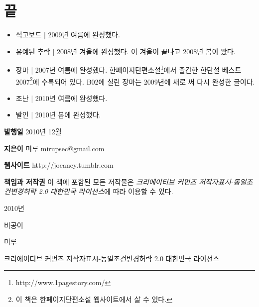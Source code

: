 \documentclass[a5paper,10pt, twoside, openright]{memoir}
\begin{document}
	\newpage{}
	\section*{}
	
\backmatter %

	\newpage{}
		\pagestyle{empty}	
	\tableofcontents*{}
	
	\chapter*{끝}
	\begin{itemize}
	\item{석고보드} | 2009년 여름에 완성했다.
	 
	 \item{유예된 추락} | 2008년 겨울에 완성했다. 이 겨울이 끝나고 2008년 봄이 왔다.
	
	\item{장마} | 2007년 여름에 완성했다. 한페이지단편소설\footnote{http://www.1pagestory.com/}에서 출간한 한단설 베스트 2007\footnote{이 책은 한페이지단편소설 웹사이트에서 살 수 있다.}에 수록되어 있다. B02에 실린 장마는 2009년에 새로 써 다시 완성한 글이다.

	\item{조난} | 2010년 여름에 완성했다.
	
	\item{발인} | 2010년 봄에 완성했다.
	\end{itemize}

	\newpage{}
	\calccentering{\unitlength}
	\begin{adjustwidth*}{7em}{1em}
	\begin{description}
	\item{\textbf{발행일}}
		2010년 12월
	\item{\textbf{지은이}} 
		미루 mirupsec@gmail.com
	\item{\textbf{웹사이트}}
		http://joeaney.tumblr.com
	\item{\textbf{책임과 저작권}}
		이 책에 포함된 모든 저작물은 \emph{크리에이티브 커먼즈 저작자표시-동일조건변경허락 2.0 대한민국 라이선스}에 따라 이용할 수 있다. 
	\end{description}
	\end{adjustwidth*}
	
	\newpage{}
	2010년
	
	비공이
	
	미루
	
	\begin{center}
	\scriptsize{크리에이티브 커먼즈 저작자표시-동일조건변경허락 2.0 대한민국 라이선스}\pagebreak
	\end{center}
\end{document}
